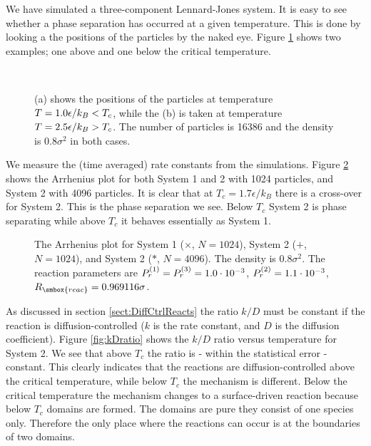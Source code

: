 We have simulated a three-component Lennard-Jones system. It is easy
to see whether a phase separation has occurred at a given
temperature. This is done by looking a the positions of the particles
by the naked eye. Figure \ref{fig:PhaseSep} shows two examples; one
above and one below the critical temperature.

\begin{figure}
  \centering
  \mbox{
    \quad
  }
  \caption[Configurations below and above the critical temperature]{(a)
  shows the positions of the particles at
  temperature \protect$T=1.0\epsilon/k_B  < T_c\protect$, while the
  (b) is taken at temperature \protect$T=2.5\epsilon/k_B >
  T_c\protect$. The number of particles is 16386 and the density is
  $0.8\sigma^2$ in both cases.\label{fig:PhaseSep}}
\end{figure}

We measure the (time averaged) rate constants from the
simulations. Figure \ref{fig:Arrhenius1024} shows the Arrhenius plot
for both System 1 and 2 with 1024 particles, and System 2 with 4096
particles. It is clear that at $T_c = 1.7\epsilon/k_B$ there is a
cross-over for System 2. This is the phase separation we see. Below
$T_c$ System 2 is phase separating while above $T_c$ it behaves
essentially as System 1. 

\begin{figure}
  \begin{center}
    
  \end{center}
  \caption[Arrhenius plot]{The Arrhenius plot for System 1 ($\times$, $N=1024$), System 2
    ($+$, $N=1024$), and System 2 ($*$, $N=4096$). The density is
    $0.8\sigma^2$. The reaction parameters are \protect$P_r^{(1)} =
    P_r^{(3)} = 1.0\cdot 10^{-3}\protect$, \protect$P_r^{(2)} = 1.1\cdot
    10^{-3}\protect$, \protect$R_{\smbox{reac}} =
    0.969116\sigma\protect$.\label{fig:Arrhenius1024}} 
\end{figure}

As discussed in section \ref{sect:DiffCtrlReacts} the ratio $k/D$ must
be constant if the reaction is diffusion-controlled ($k$ is the rate
constant, and $D$ is the diffusion coefficient). Figure
\ref{fig:kDratio} shows the $k/D$ ratio versus temperature for System
2. We see that above $T_c$ the ratio is - within
the statistical error - constant. This clearly indicates that the
reactions are diffusion-controlled above the critical temperature,
while below $T_c$ the mechanism is different. Below the critical temperature
the mechanism changes to a surface-driven reaction because below $T_c$
domains are formed. The domains are pure \ie they consist of one
species only. Therefore the only place where the reactions can occur
is at the boundaries of two domains.

